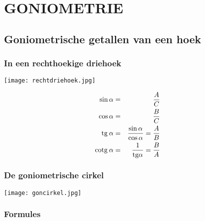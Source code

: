 \section{GONIOMETRIE} \label{goniometrie}
\hypertarget{goniometrie}{}

\subsection{Goniometrische getallen van een hoek} \label{goniometrische_getallen}
\hypertarget{goniometrische_getallen}{}

\subsubsection{In een rechthoekige driehoek} \label{rechthoekige_driehoek}
\hypertarget{rechthoekige_driehoek}{}

\begin{center}
\texttt{[image: rechtdriehoek.jpg]}
\end{center}
\begin{eqnarray*}
\sin\alpha&=&\displaystyle\frac{\displaystyle A}{\displaystyle C}\\
\cos\alpha&=&\displaystyle\frac{\displaystyle B}{\displaystyle C}\\
\mbox{tg}\:\alpha&=&\displaystyle\frac{\displaystyle \sin\alpha}{\displaystyle \cos\alpha}=\displaystyle\frac{\displaystyle A}{\displaystyle B}\\
\mbox{cotg}\:\alpha&=&\displaystyle\frac{\displaystyle 1}{\displaystyle \mbox{tg}\alpha}=\displaystyle\frac{\displaystyle B}{\displaystyle A}
\end{eqnarray*}

\subsubsection{De goniometrische cirkel} \label{goniometrische_cirkel}
\hypertarget{goniometrische_cirkel}{}

\begin{center}
\texttt{[image: goncirkel.jpg]}
\end{center}

\subsubsection{Formules} \label{goniometrische_formules}
\hypertarget{goniometrische_formules}{}

